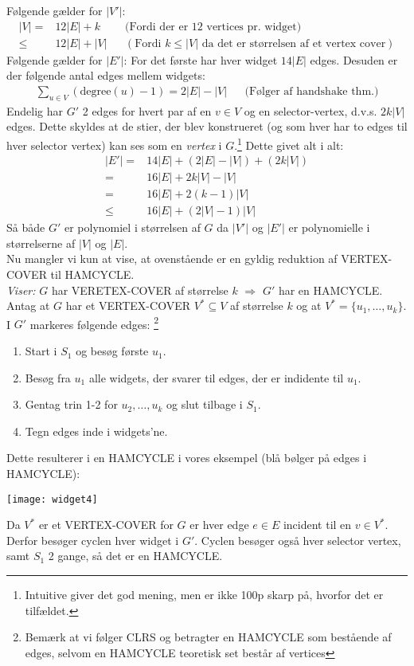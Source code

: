 Følgende gælder for $|V'|$:
\begin{align*}
	|V| =& 12|E| + k && \text{(Fordi der er 12 vertices pr. widget)} \\
	\le& 12|E| + |V|  && (\text{Fordi } k \le |V| \text{ da det er størrelsen af et vertex cover})
\end{align*}
Følgende gælder for $|E'|$: For det første har hver widget $14|E|$ edges. Desuden er der følgende antal edges mellem widgets:
\begin{align*}	
	\sum_{u \in V} (\text{degree}(u)-1) = 2|E|-|V| && \text{(Følger af handshake thm.)} 
\end{align*}
Endelig har $G'$ 2 edges for hvert par af en $v \in V$ og en selector-vertex, d.v.s. $2k|V|$ edges. Dette skyldes at de stier, der blev konstrueret (og som hver har to edges til hver selector vertex) kan ses som en \textit{vertex} i $G$.\footnote{Intuitive giver det god mening, men er ikke 100p skarp på, hvorfor det er tilfældet.} Dette givet alt i alt: 
\begin{align*}
	|E'| =& 14|E|+(2|E|-|V|)+(2k|V|) \\
	=& 16|E|+2k|V|-|V| \\
	=& 16|E|+2(k-1)|V| \\
	\le& 16|E|+(2|V|-1)|V| 
\end{align*}
Så både $G'$ er polynomiel i størrelsen af $G$ da $|V'|$ og $|E'|$ er polynomielle i størrelserne af $|V|$ og $|E|$. \\

Nu mangler vi kun at vise, at ovenstående er en gyldig reduktion af VERTEX-COVER til HAMCYCLE. \\

\textit{Viser:} $G$ har VERETEX-COVER af størrelse $k$ $\Longrightarrow$ $G'$ har en HAMCYCLE. \\

Antag at $G$ har et VERTEX-COVER $V^* \subseteq V$ af størrelse $k$ og at $V^*=\{u_1,\ldots,u_k\}$. I $G'$ markeres følgende edges: \footnote{Bemærk at vi følger CLRS og betragter en HAMCYCLE som bestående af edges, selvom en HAMCYCLE teoretisk set består af vertices}
\begin{enumerate}
	\item Start i $S_1$ og besøg første $u_1$. 
	\item Besøg fra $u_1$ alle widgets, der svarer til edges, der er indidente til $u_1$. 
	\item Gentag trin 1-2 for $u_2,\ldots,u_k$ og slut tilbage i $S_1$. 
	\item Tegn edges inde i widgets'ne.  
\end{enumerate} 
Dette resulterer i en HAMCYCLE i vores eksempel (blå bølger på edges i HAMCYCLE):
\begin{center}
	\texttt{[image: widget4]}
\end{center}
Da $V^*$ er et VERTEX-COVER for $G$ er hver edge $e \in E$ incident til en $v \in V^*$. Derfor besøger cyclen hver widget i $G'$. Cyclen besøger også hver selector vertex, samt $S_1$ 2 gange, så det er en HAMCYCLE. \\

